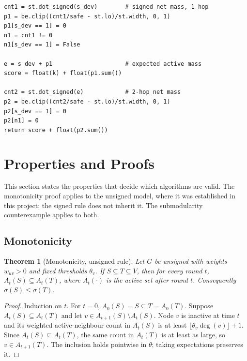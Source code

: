 \documentclass[journal,letterpaper,10pt]{IEEEtran}
\newtheorem{theorem}{Theorem}
\begin{document}
\begin{lstlisting}[style=pycode,caption={Majority-rule surrogate fitness used by the fixed ABCVNS.},label={lst:mr}]
cnt1 = st.dot_signed(s_dev)        # signed net mass, 1 hop
p1 = be.clip((cnt1/safe - st.lo)/st.width, 0, 1)
p1[s_dev == 1] = 0
n1 = cnt1 != 0
n1[s_dev == 1] = False

e = s_dev + p1                     # expected active mass
score = float(k) + float(p1.sum())

cnt2 = st.dot_signed(e)            # 2-hop net mass
p2 = be.clip((cnt2/safe - st.lo)/st.width, 0, 1)
p2[s_dev == 1] = 0
p2[n1] = 0
return score + float(p2.sum())
\end{lstlisting}

\section{Properties and Proofs}

This section states the properties that decide which algorithms are valid. The monotonicity proof applies to the unsigned model, where it was established in this project; the signed rule does not inherit it. The submodularity counterexample applies to both.

\subsection{Monotonicity}

\begin{theorem}[Monotonicity, unsigned rule]
Let $G$ be unsigned with weights $w_{uv}>0$ and fixed thresholds $\theta_v$. If $S\subseteq T\subseteq V$, then for every round $t$, $A_t(S)\subseteq A_t(T)$, where $A_t(\cdot)$ is the active set after round $t$. Consequently $\sigma(S)\le\sigma(T)$.
\end{theorem}

\begin{proof}
Induction on $t$. For $t=0$, $A_0(S)=S\subseteq T=A_0(T)$. Suppose $A_t(S)\subseteq A_t(T)$ and let $v\in A_{t+1}(S)\setminus A_t(S)$. Node $v$ is inactive at time $t$ and its weighted active-neighbour count in $A_t(S)$ is at least $\lfloor\theta_v\deg(v)\rfloor+1$. Since $A_t(S)\subseteq A_t(T)$, the same count in $A_t(T)$ is at least as large, so $v\in A_{t+1}(T)$. The inclusion holds pointwise in $\theta$; taking expectations preserves it.
\end{proof}
\end{document}
